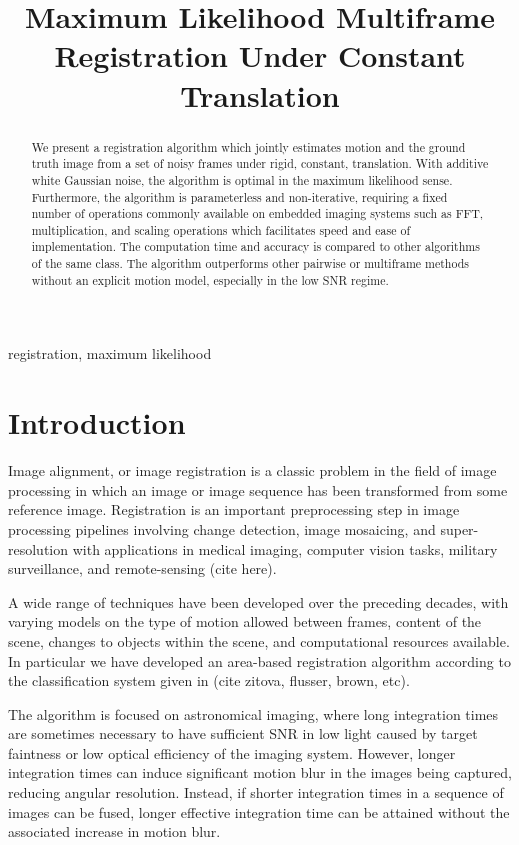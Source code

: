 \documentclass{article}
\title{Maximum Likelihood Multiframe Registration Under Constant Translation}
\begin{document}
%
\maketitle
%
\begin{abstract}
  We present a registration algorithm which jointly estimates motion and the ground truth image from a set of noisy frames under rigid, constant, translation.  With additive white Gaussian noise, the algorithm is optimal in the maximum likelihood sense.  Furthermore, the algorithm is parameterless and non-iterative, requiring a fixed number of operations commonly available on embedded imaging systems such as FFT, multiplication, and scaling operations which facilitates speed and ease of implementation.  The computation time and accuracy is compared to other algorithms of the same class.  The algorithm outperforms other pairwise or multiframe methods without an explicit motion model, especially in the low SNR regime.
\end{abstract}
%
\begin{keywords}
  registration, maximum likelihood
\end{keywords}
%
%
\section{Introduction}
\label{sec:introduction}

Image alignment, or image registration is a classic problem in the field of image processing in which an image or image sequence has been transformed from some reference image.
Registration is an important preprocessing step in image processing pipelines involving change detection, image mosaicing, and super-resolution with applications in medical imaging, computer vision tasks, military surveillance, and remote-sensing (cite here).

A wide range of techniques have been developed over the preceding decades, with varying models on the type of motion allowed between frames, content of the scene, changes to objects within the scene, and computational resources available.  In particular we have developed an area-based registration algorithm according to the classification system given in (cite zitova, flusser, brown, etc).

The algorithm is focused on astronomical imaging, where long integration times are sometimes necessary to have sufficient SNR in low light caused by target faintness or low optical efficiency of the imaging system.  However, longer integration times can induce significant motion blur in the images being captured, reducing angular resolution.  Instead, if shorter integration times in a sequence of images can be fused, longer effective integration time can be attained without the associated increase in motion blur.
\end{document}
